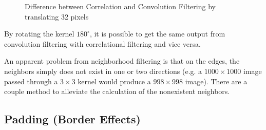 \documentclass[twoside,a4paper,article]{combine}
\begin{document}
\begin{minipage}{\textwidth}\begin{figure}[H]
    \centering
    \caption{Difference between Correlation and Convolution Filtering by translating 32 pixels}
\end{figure}\end{minipage}

By rotating the kernel $180^\circ$, it is possible to get the same output from convolution filtering with correlational filtering and vice versa\cite{Gonzalez_Woods_2018}.

An apparent problem from neighborhood filtering is that on the edges, the neighbors simply does not exist in one or two directions 
(e.g. a $1000\times1000$ image passed through a $3\times3$ kernel would produce a $998\times998$ image). 
There are a couple method to alleviate the calculation of the nonexistent neighbors.

\subsection{Padding (Border Effects)}
\end{document}
